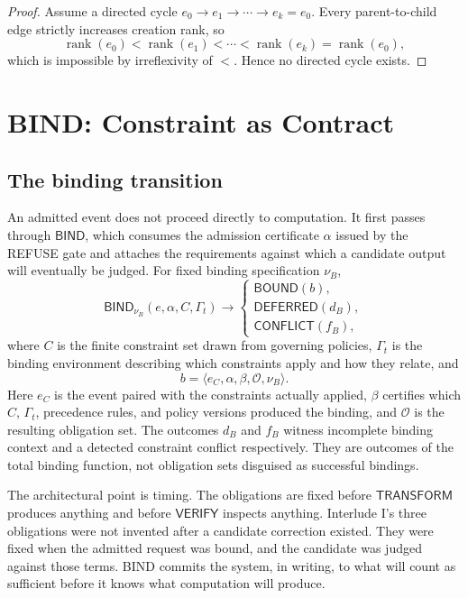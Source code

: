 \documentclass[11pt,openany]{book}
\newcommand{\Bind}{\mathsf{BIND}}
\newcommand{\Transform}{\mathsf{TRANSFORM}}
\newcommand{\Verify}{\mathsf{VERIFY}}
\begin{document}
\begin{proof}
Assume a directed cycle
\(e_0\to e_1\to\cdots\to e_k=e_0\). Every parent-to-child edge strictly
increases creation rank, so
\[
 \operatorname{rank}(e_0)<\operatorname{rank}(e_1)<\cdots
 <\operatorname{rank}(e_k)=\operatorname{rank}(e_0),
\]
which is impossible by irreflexivity of \(<\). Hence no directed cycle exists.
\end{proof}

\chapter{BIND: Constraint as Contract}
\section{The binding transition}

An admitted event does not proceed directly to computation. It first passes
through \(\Bind\), which consumes the admission certificate \(\alpha\) issued
by the REFUSE gate and attaches the requirements against which a candidate
output will eventually be judged. For fixed binding specification \(\nu_B\),
\[
 \Bind_{\nu_B}(e,\alpha,C,\Gamma_t)\longrightarrow
 \begin{cases}
  \mathsf{BOUND}(b),\\
  \mathsf{DEFERRED}(d_B),\\
  \mathsf{CONFLICT}(f_B),
 \end{cases}
\]
where \(C\) is the finite constraint set drawn from governing policies,
\(\Gamma_t\) is the binding environment describing which constraints apply and
how they relate, and
\[
 b=\langle e_C,\alpha,\beta,\mathcal O,\nu_B\rangle.
\]
Here \(e_C\) is the event paired with the constraints actually applied,
\(\beta\) certifies which \(C\), \(\Gamma_t\), precedence rules, and policy
versions produced the binding, and \(\mathcal O\) is the resulting obligation
set. The outcomes \(d_B\) and \(f_B\) witness incomplete binding context and a
detected constraint conflict respectively. They are outcomes of the total
binding function, not obligation sets disguised as successful bindings.

The architectural point is timing. The obligations are fixed before
\(\Transform\) produces anything and before \(\Verify\) inspects anything.
Interlude I's three obligations were not invented after a candidate correction
existed. They were fixed when the admitted request was bound, and the candidate
was judged against those terms. BIND commits the system, in writing, to what
will count as sufficient before it knows what computation will produce.
\end{document}
